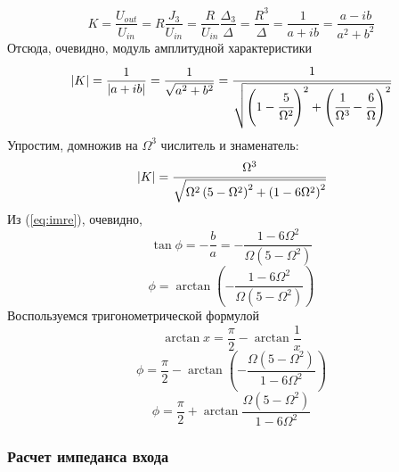 \begin{equation}
	\label{eq:imre}
	K=\frac{U_{out}}{U_{in}}=R\frac{J_3}{U_{in}}=\frac{R}{U_{in}}\frac{\Delta_3}{\Delta}=\frac{R^3}{\Delta}=\frac{1}{a+ib}=\frac{a-ib}{a^2+b^2}
\end{equation}
Отсюда, очевидно, модуль амплитудной характеристики
\begin{equation}
	|K|=\frac{1}{|a+ib|}=\frac{1}{\sqrt{a^2+b^2}}
	=
	\cfrac{1}{
	\sqrt{
	\left(
		1
		-\cfrac{5}{\Omega^2}
	\right)^2
	+
	\left(
		\cfrac{1}{\Omega^3}
		-\cfrac{6}{\Omega}
	\right)^2	
	}}
\end{equation}
Упростим, домножив на $\Omega^3$ числитель и знаменатель:
\begin{equation}
	|K|=
	\cfrac{\Omega^3}{
	\sqrt{
	\Omega^2\left(
		5-\Omega^2
	\right)^2
	+
	\left(
		1
		-{6}{\Omega}^2
	\right)^2	
	}}
\end{equation}
Из (\ref{eq:imre}), очевидно,
\begin{equation}
	\tan\phi=-\frac{b}{a}=-\frac{1-6\Omega^2}{\Omega(5-\Omega^2)}
\end{equation}
\begin{equation}
	\phi=\arctan
	\left(
		-\frac{1-6\Omega^2}{\Omega(5-\Omega^2)}
	\right)
\end{equation}
Воспользуемся тригонометрической формулой
\begin{equation}
	\arctan x = \frac{\pi}{2}-\arctan\frac{1}{x}
\end{equation}
\begin{equation}
	\phi=\frac{\pi}{2}-\arctan(-\frac{\Omega(5-\Omega^2)}{1-6\Omega^2})
\end{equation}
\begin{equation}
	\phi=\frac{\pi}{2}+\arctan\frac{\Omega(5-\Omega^2)}{1-6\Omega^2}
\end{equation}

\subsubsection{Расчет импеданса входа}
    
